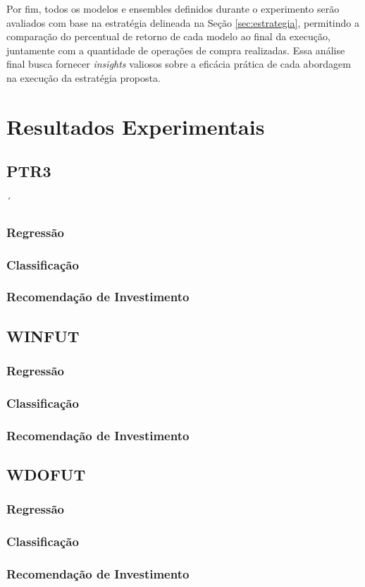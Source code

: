 Por fim, todos os modelos e ensembles definidos durante o experimento serão avaliados com base na estratégia delineada na Seção \ref{sec:estrategia}, permitindo a comparação do percentual de retorno de cada modelo ao final da execução, juntamente com a quantidade de operações de compra realizadas. Essa análise final busca fornecer \textit{insights} valiosos sobre a eficácia prática de cada abordagem na execução da estratégia proposta.

\section{Resultados Experimentais}
\label{sec:resultados_experimentais}
\subsection{PTR3}´
\subsubsection{Regressão}
\subsubsection{Classificação}
\subsubsection{Recomendação de Investimento}
\subsection{WINFUT}
\subsubsection{Regressão}
\subsubsection{Classificação}
\subsubsection{Recomendação de Investimento}
\subsection{WDOFUT}
\subsubsection{Regressão}
\subsubsection{Classificação}
\subsubsection{Recomendação de Investimento}


